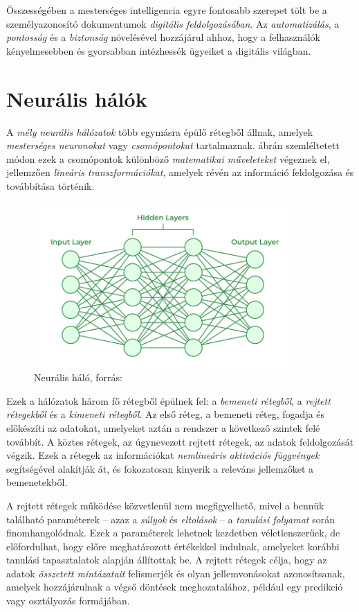 \documentclass[
]{thesis-ekf}
\theoremstyle{definition}
\theoremstyle{remark}
\begin{document}
	Összességében a mesterséges intelligencia egyre fontosabb szerepet tölt be a személyazonosító dokumentumok \emph{digitális feldolgozásában}. Az \emph{automatizálás}, a \emph{pontosság} és a \emph{biztonság} növelésével hozzájárul ahhoz, hogy a felhasználók kényelmesebben és gyorsabban intézhessék ügyeiket a digitális világban.

\chapter{Neurális hálók}
A \emph{mély neurális hálózatok} több egymásra épülő rétegből állnak, amelyek \emph{mesterséges neuronokat} vagy \emph{csomópontokat} tartalmaznak.  ábrán szemléltetett módon ezek a csomópontok különböző \emph{matematikai műveleteket} végeznek el, jellemzően \emph{lineáris transzformációkat}, amelyek révén az információ feldolgozása és továbbítása történik.

\begin{figure} \centering \includegraphics[width=10cm]{Neural-Networks-Architecture} \caption{Neurális háló, forrás: \cite{neuralNetworkImage}} \label{fig-neural} \end{figure}

Ezek a hálózatok három fő rétegből épülnek fel: a \emph{bemeneti rétegből}, a \emph{rejtett rétegekből} és a \emph{kimeneti rétegből}. Az első réteg, a bemeneti réteg, fogadja és előkészíti az adatokat, amelyeket aztán a rendszer a következő szintek felé továbbít. A köztes rétegek, az úgynevezett rejtett rétegek, az adatok feldolgozását végzik. Ezek a rétegek az információkat \emph{nemlineáris aktivációs függvények} segítségével alakítják át, és fokozatosan kinyerik a releváns jellemzőket a bemenetekből. \cite{neuralNetwork}

A rejtett rétegek működése közvetlenül nem megfigyelhető, mivel a bennük található paraméterek – azaz a \emph{súlyok} és \emph{eltolások} – a \emph{tanulási folyamat} során finomhangolódnak. Ezek a paraméterek lehetnek kezdetben véletlenszerűek, de előfordulhat, hogy előre meghatározott értékekkel indulnak, amelyeket korábbi tanulási tapasztalatok alapján állítottak be. A rejtett rétegek célja, hogy az adatok \emph{összetett mintázatait} felismerjék és olyan jellemvonásokat azonosítsanak, amelyek hozzájárulnak a végső döntések meghozatalához, például egy predikció vagy osztályozás formájában. \cite{neuralNetwork}
\end{document}
